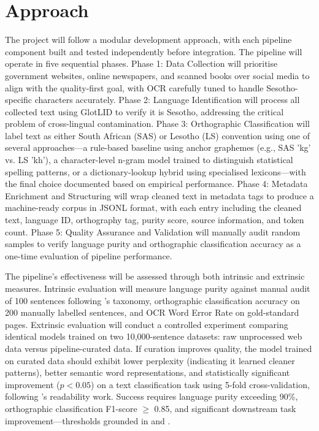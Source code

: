 \documentclass[11pt,a4paper]{article}
\begin{document}
\section{Approach}
The project will follow a modular development approach, with each pipeline component built and tested independently before integration. The pipeline will operate in five sequential phases. Phase 1: Data Collection will prioritise government websites, online newspapers, and scanned books over social media to align with the quality-first goal, with OCR carefully tuned to handle Sesotho-specific characters accurately. Phase 2: Language Identification will process all collected text using GlotLID \citep{kargaran2023glotlid} to verify it is Sesotho, addressing the critical problem of cross-lingual contamination. Phase 3: Orthographic Classification will label text as either South African (SAS) or Lesotho (LS) convention using one of several approaches—a rule-based baseline using anchor graphemes (e.g., SAS 'kg' vs. LS 'kh'), a character-level n-gram model trained to distinguish statistical spelling patterns, or a dictionary-lookup hybrid using specialised lexicons—with the final choice documented based on empirical performance. Phase 4: Metadata Enrichment and Structuring will wrap cleaned text in metadata tags to produce a machine-ready corpus in JSONL format, with each entry including the cleaned text, language ID, orthography tag, purity score, source information, and token count. Phase 5: Quality Assurance and Validation will manually audit random samples to verify language purity and orthographic classification accuracy as a one-time evaluation of pipeline performance.

The pipeline's effectiveness will be assessed through both intrinsic and extrinsic measures. Intrinsic evaluation will measure language purity against manual audit of 100 sentences following \citet{kreutzer-etal-2022-quality}'s taxonomy, orthographic classification accuracy on 200 manually labelled sentences, and OCR Word Error Rate on gold-standard pages. Extrinsic evaluation will conduct a controlled experiment comparing identical models trained on two 10,000-sentence datasets: raw unprocessed web data versus pipeline-curated data. If curation improves quality, the model trained on curated data should exhibit lower perplexity (indicating it learned cleaner patterns), better semantic word representations, and statistically significant improvement ($p < 0.05$) on a text classification task using 5-fold cross-validation, following \citet{Sibeko2024}'s readability work. Success requires language purity exceeding 90\%, orthographic classification F1-score $\geq$ 0.85, and significant downstream task improvement—thresholds grounded in \citet{kreutzer-etal-2022-quality} and \citet{Makutoane2022}.
\vspace{1em}
\end{document}
